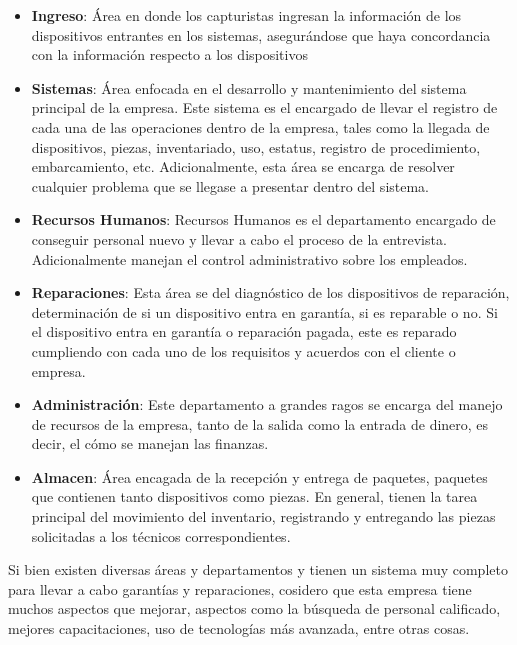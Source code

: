 \begin{itemize}
	\item \textbf{Ingreso}: Área en donde los capturistas ingresan la información de
	      los dispositivos entrantes en los sistemas, asegurándose que haya
	      concordancia con la información respecto a los dispositivos

	\item \textbf{Sistemas}: Área enfocada en el desarrollo y mantenimiento del sistema
	      principal de la empresa. Este sistema es el encargado de llevar el registro
	      de cada una de las operaciones dentro de la empresa, tales como la llegada de
	      dispositivos, piezas, inventariado, uso, estatus, registro de procedimiento,
	      embarcamiento, etc. Adicionalmente, esta área se encarga de resolver
	      cualquier problema que se llegase a presentar dentro del sistema.

	\item \textbf{Recursos Humanos}: Recursos Humanos es el departamento encargado
	      de conseguir personal nuevo y llevar a cabo el proceso de la entrevista.
	      Adicionalmente manejan el control administrativo sobre los empleados.

	\item \textbf{Reparaciones}: Esta área se del diagnóstico de los dispositivos de
	      reparación, determinación de si un dispositivo entra en garantía, si es reparable
	      o no. Si el dispositivo entra en garantía o reparación pagada, este es reparado
	      cumpliendo con cada uno de los requisitos y acuerdos con el cliente o empresa.

	\item \textbf{Administración}: Este departamento a grandes ragos se encarga del
	      manejo de recursos de la empresa, tanto de la salida como la entrada de
	      dinero, es decir, el cómo se manejan las finanzas.

	\item \textbf{Almacen}: Área encagada de la recepción y entrega de paquetes,
	      paquetes que contienen tanto dispositivos como piezas. En general, tienen la
	      tarea principal del movimiento del inventario, registrando y entregando las piezas
	      solicitadas a los técnicos correspondientes.
\end{itemize}

Si bien existen diversas áreas y departamentos y tienen un sistema muy completo para
llevar a cabo garantías y reparaciones, cosidero que esta empresa tiene muchos
aspectos que mejorar, aspectos como la búsqueda de personal calificado, mejores
capacitaciones, uso de tecnologías más avanzada, entre otras cosas.

